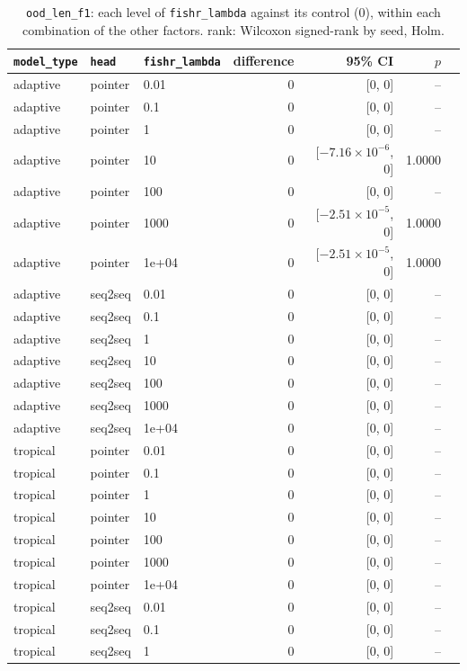 \documentclass[10pt]{article}
\begin{document}
{\small
\begin{longtable}{lllrrrl}
\caption{\texttt{ood\_len\_f1}: each level of \texttt{fishr\_lambda} against its control (0), within each combination of the other factors. rank: Wilcoxon signed-rank by seed, Holm.}\label{tab:control-ood_len_f1}\\
\toprule
\texttt{model\_type} & \texttt{head} & \texttt{fishr\_lambda} & difference & 95\% CI & $p$ & \\
\midrule
\endhead
adaptive & pointer & 0.01 & 0 & [0, 0] & -- & \\
adaptive & pointer & 0.1 & 0 & [0, 0] & -- & \\
adaptive & pointer & 1 & 0 & [0, 0] & -- & \\
adaptive & pointer & 10 & 0 & [$-7.16\times10^{-6}$, 0] & 1.0000 & \\
adaptive & pointer & 100 & 0 & [0, 0] & -- & \\
adaptive & pointer & 1000 & 0 & [$-2.51\times10^{-5}$, 0] & 1.0000 & \\
adaptive & pointer & 1e+04 & 0 & [$-2.51\times10^{-5}$, 0] & 1.0000 & \\
adaptive & seq2seq & 0.01 & 0 & [0, 0] & -- & \\
adaptive & seq2seq & 0.1 & 0 & [0, 0] & -- & \\
adaptive & seq2seq & 1 & 0 & [0, 0] & -- & \\
adaptive & seq2seq & 10 & 0 & [0, 0] & -- & \\
adaptive & seq2seq & 100 & 0 & [0, 0] & -- & \\
adaptive & seq2seq & 1000 & 0 & [0, 0] & -- & \\
adaptive & seq2seq & 1e+04 & 0 & [0, 0] & -- & \\
tropical & pointer & 0.01 & 0 & [0, 0] & -- & \\
tropical & pointer & 0.1 & 0 & [0, 0] & -- & \\
tropical & pointer & 1 & 0 & [0, 0] & -- & \\
tropical & pointer & 10 & 0 & [0, 0] & -- & \\
tropical & pointer & 100 & 0 & [0, 0] & -- & \\
tropical & pointer & 1000 & 0 & [0, 0] & -- & \\
tropical & pointer & 1e+04 & 0 & [0, 0] & -- & \\
tropical & seq2seq & 0.01 & 0 & [0, 0] & -- & \\
tropical & seq2seq & 0.1 & 0 & [0, 0] & -- & \\
tropical & seq2seq & 1 & 0 & [0, 0] & -- & \\

\end{longtable}}
\end{document}

